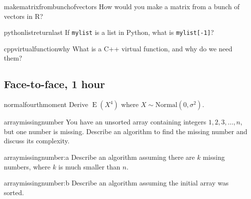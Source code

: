 \documentclass[a4paper]{article}
\begin{document}
\begin{question}{makematrixfrombunchofvectors}
How would you make a matrix from a bunch of vectors in R?
\end{question}

\begin{question}{pythonlistreturnlast}
If \verb+mylist+ is a list in Python, what is \verb+mylist[-1]+?
\end{question}

\begin{question}{cppvirtualfunctionwhy}
What is a C++ virtual function, and why do we need them?
\end{question}

\clearpage








\clearpage
\subsection{Face-to-face, 1 hour}
\begin{question}{normalfourthmoment}
Derive $\operatorname{E}(X^4)$ where $X \sim \text{Normal}\left(0, \sigma^2\right)$.
\end{question}


\begin{question}{arraymissingnumber}
You have an unsorted array containing integers $1,2,3, \ldots, n$, but one number is missing.
Describe an algorithm to find the missing number and discuss its complexity.
\end{question}


\begin{subquestion}{arraymissingnumber:a}
Describe an algorithm assuming there are $k$ missing numbers, where $k$ is much smaller than $n$.
\end{subquestion}


\begin{subquestion}{arraymissingnumber:b}
Describe an algorithm assuming the initial array was sorted.
\end{subquestion}


\clearpage




\end{document}
